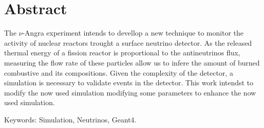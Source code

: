 %
%
\chapter*{Abstract}
\vspace{-1.5cm}

\noindent 


The $\nu$-Angra experiment intends to devellop a new technique to monitor the activity of nuclear reactors trought a surface neutrino detector. As the released thermal energy of a fission reactor is proportional to the antineutrinos flux, measuring the flow rate of these particles allow us to infere the amount of burned combustive and its compositions. Given the complexity of the detector, a simulation is necessary to validate events in the detector. This work intendst to modify the now used simulation modifying some parameters to enhance the now used simulation.
\vspace{0.5cm}

\noindent Keywords: Simulation, Neutrinos, Geant4. \\

\newpage
